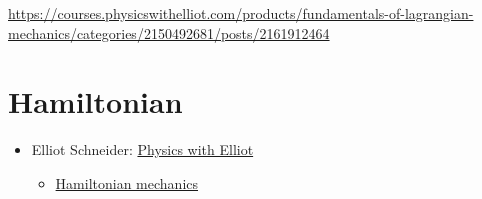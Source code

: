 \documentclass[
]{book}
\providecommand{\tightlist}{%
  \setlength{\itemsep}{0pt}\setlength{\parskip}{0pt}}
\theoremstyle{definition}
\theoremstyle{definition}
\theoremstyle{definition}
\theoremstyle{definition}
\theoremstyle{remark}
\begin{document}
\url{https://courses.physicswithelliot.com/products/fundamentals-of-lagrangian-mechanics/categories/2150492681/posts/2161912464}

\chapter{Hamiltonian}\label{hamiltonian}

\begin{itemize}
\tightlist
\item
  Elliot Schneider: \href{https://www.youtube.com/@PhysicswithElliot/playlists}{Physics with Elliot}

  \begin{itemize}
  \tightlist
  \item
    \href{https://www.youtube.com/playlist?list=PL-IZN8QRUw-zBECgfYLuDQ3qkWsXWAGhM}{Hamiltonian mechanics}
  \end{itemize}
\end{itemize}
\end{document}
